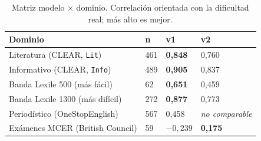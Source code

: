 \documentclass[11pt,a4paper]{article}
\newcommand{\cod}[1]{\texttt{\small #1}}
\begin{document}
\begin{table}[htbp]
\centering
\small
\begin{tabular}{@{}l R{1.6cm} R{2.0cm} R{2.0cm}@{}}
\toprule
\textbf{Dominio} & \textbf{n} & \textbf{v1} & \textbf{v2} \\
\midrule
Literatura (CLEAR, \cod{Lit}) & 461 & \textbf{0,848} & 0,760 \\
Informativo (CLEAR, \cod{Info}) & 489 & \textbf{0,905} & 0,837 \\
Banda Lexile 500 (más fácil) & 62 & \textbf{0,651} & 0,459 \\
Banda Lexile 1300 (más difícil) & 272 & \textbf{0,877} & 0,773 \\
Periodístico (OneStopEnglish) & 567 & 0,458 & \emph{no comparable} \\
Exámenes MCER (British Council) & 59 & $-0{,}239$ & \textbf{0,175} \\
\bottomrule
\end{tabular}
\caption{Matriz modelo $\times$ dominio. Correlación orientada con la dificultad real;
más alto es mejor.}
\label{cuad:dominio}
\end{table}
\end{document}
